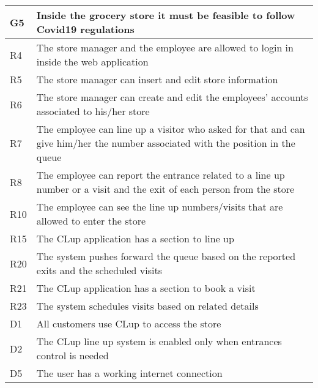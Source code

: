 \begin{center}
    {\renewcommand{\arraystretch}{1.5}
    \begin{longtable}{L{2cm}L{12cm}}
        \hline
        \textbf{G5} & \textbf{Inside the grocery store it must be feasible to follow Covid19 regulations} \\
        \hline
         R4 & The store manager and the employee are allowed to login in inside the web application \\
        \hline
         R5 & The store manager can insert and edit store information \\
        \hline
         R6 & The store manager can create and edit the employees’ accounts associated to his/her store \\
        \hline
         R7 & The employee can line up a visitor who asked for that and can give him/her the number associated with the position in the queue \\
        \hline
         R8 & The employee can report the entrance related to a line up number or a visit and the exit of each person from the store \\
        \hline
         R10 & The employee can see the line up numbers/visits that are allowed to enter the store \\
        \hline
         R15 & The CLup application has a section to line up \\
        \hline
         R20 & The system pushes forward the queue based on the reported exits and the scheduled visits \\
        \hline
         R21 & The CLup application has a section to book a visit \\
        \hline
         R23 & The system schedules visits based on related details \\
        \hline
         D1 & All customers use CLup to access the store \\
        \hline
         D2 & The CLup line up system is enabled only when entrances control is needed \\
        \hline
         D5 & The user has a working internet connection \\

\end{longtable}}
\end{center}
